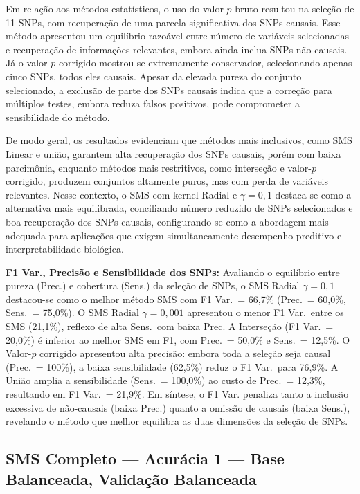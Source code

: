 \documentclass[12pt,a4paper]{article}
\newcommand{\novo}[1]{\textcolor{corNova}{#1}}
\begin{document}
Em relação aos métodos estatísticos, o uso do valor-$p$ bruto resultou na seleção de 11 SNPs, com recuperação de uma parcela significativa dos SNPs causais. Esse método apresentou um equilíbrio razoável entre número de variáveis selecionadas e recuperação de informações relevantes, embora ainda inclua SNPs não causais. Já o valor-$p$ corrigido mostrou-se extremamente conservador, selecionando apenas cinco SNPs, todos eles causais. Apesar da elevada pureza do conjunto selecionado, a exclusão de parte dos SNPs causais indica que a correção para múltiplos testes, embora reduza falsos positivos, pode comprometer a sensibilidade do método.

De modo geral, os resultados evidenciam que métodos mais inclusivos, como SMS Linear e união, garantem alta recuperação dos SNPs causais, porém com baixa parcimônia, enquanto métodos mais restritivos, como interseção e valor-$p$ corrigido, produzem conjuntos altamente puros, mas com perda de variáveis relevantes. Nesse contexto, o SMS com kernel Radial e $\gamma = 0{,}1$ destaca-se como a alternativa mais equilibrada, conciliando número reduzido de SNPs selecionados e boa recuperação dos SNPs causais, configurando-se como a abordagem mais adequada para aplicações que exigem simultaneamente desempenho preditivo e interpretabilidade biológica.


\novo{\textbf{F1 Var., Precisão e Sensibilidade dos SNPs:} Avaliando o equilíbrio entre pureza (Prec.) e cobertura (Sens.) da seleção de SNPs, o SMS Radial $\gamma=0{,}1$ destacou-se como o melhor método SMS com F1 Var.\ = 66,7\% (Prec.\ = 60,0\%, Sens.\ = 75,0\%). O SMS Radial $\gamma=0{,}001$ apresentou o menor F1 Var.\ entre os SMS (21,1\%), reflexo de alta Sens.\ com baixa Prec. A Interseção (F1 Var.\ = 20,0\%) é inferior ao melhor SMS em F1, com Prec.\ = 50,0\% e Sens.\ = 12,5\%. O Valor-$p$ corrigido apresentou alta precisão: embora toda a seleção seja causal (Prec.\ = 100\%), a baixa sensibilidade (62,5\%) reduz o F1 Var.\ para 76,9\%. A União amplia a sensibilidade (Sens.\ = 100,0\%) ao custo de Prec.\ = 12,3\%, resultando em F1 Var.\ = 21,9\%. Em síntese, o F1 Var. penaliza tanto a inclusão excessiva de não-causais (baixa Prec.) quanto a omissão de causais (baixa Sens.), revelando o método que melhor equilibra as duas dimensões da seleção de SNPs.}
\subsection{SMS Completo --- Acurácia 1 --- Base Balanceada, Validação Balanceada}
\end{document}
